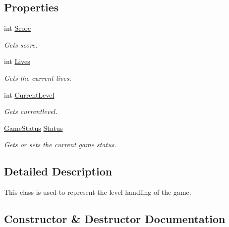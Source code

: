 \subsection*{Properties}
\begin{DoxyCompactItemize}
\item 
int \mbox{\hyperlink{class_o_e_invaders_1_1_logic_1_1_level_a84adc76c83210d45ae4ffca2fe39619e}{Score}}
\begin{DoxyCompactList}\small\item\em Gets score. \end{DoxyCompactList}\item 
int \mbox{\hyperlink{class_o_e_invaders_1_1_logic_1_1_level_aeb744ea1bd40375b396fb21139043ac0}{Lives}}
\begin{DoxyCompactList}\small\item\em Gets the current lives. \end{DoxyCompactList}\item 
int \mbox{\hyperlink{class_o_e_invaders_1_1_logic_1_1_level_a374f36718ffeced4c7cfc8c0b00ea9bd}{Current\+Level}}
\begin{DoxyCompactList}\small\item\em Gets currentlevel. \end{DoxyCompactList}\item 
\mbox{\hyperlink{namespace_o_e_invaders_1_1_logic_a3a33299067117ed9f3eb584100b34298}{Game\+Status}} \mbox{\hyperlink{class_o_e_invaders_1_1_logic_1_1_level_ab1eb498acf715240a0ed0504e7219329}{Status}}
\begin{DoxyCompactList}\small\item\em Gets or sets the current game status. \end{DoxyCompactList}\end{DoxyCompactItemize}


\subsection{Detailed Description}
This class is used to represent the level handling of the game. 



\subsection{Constructor \& Destructor Documentation}
\mbox{\label{class_o_e_invaders_1_1_logic_1_1_level_a0c394590bc1cc859545777462a5be549}} 
